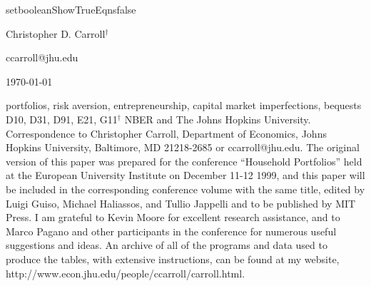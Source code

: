 \documentclass[12pt]{article}
\begin{document}
 

 

setboolean{ShowTrueEqns}{false} 
 

 

 

 

 

 




\begin{titlepage}\medskip\medskip\vspace{.5in}\normalsize\centerline{\large Christopher
D.
Carroll$^\dagger$}\centerline{ccarroll@jhu.edu}\medskip\vspace{.2in}%
\centerline{\today}\vspace{1.5in} portfolios, risk
aversion, entrepreneurship, capital market imperfections,
bequests\medskip\medskip{} D10, D31, D91, E21,
G11\vspace{.2in}\medskip\medskip\small $^\dagger$ NBER and The Johns Hopkins
University.  Correspondence to Christopher Carroll, Department of Economics,
Johns Hopkins University, Baltimore, MD 21218-2685 or ccarroll@jhu.edu. 
\medskip\medskip \small The original version of this paper was prepared for
the conference ``Household Portfolios'' held at the European University
Institute on December 11-12 1999, and this paper will be included in the
corresponding conference volume with the same title, edited by Luigi Guiso,
Michael Haliassos, and Tullio Jappelli and to be published by MIT Press.  I
am grateful to Kevin Moore for excellent research assistance, and to Marco
Pagano and other participants in the conference for numerous useful
suggestions and ideas.  An archive of all of the programs and data used to
produce the tables, with extensive instructions, can be found at my website,
http://www.econ.jhu.edu/people/ccarroll/carroll.html.\end{titlepage}
\end{document}
